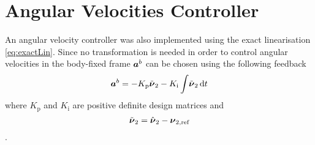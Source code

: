 \section{Angular Velocities Controller}  
An angular velocity controller was also implemented using the exact linearisation \eqref{eq:exactLin}.
Since no transformation is needed in order to control angular velocities in the body-fixed frame
$\accVector^b$ can be chosen using the following \abbrPI feedback 
\begin{equation}
	\accVector^b =-K_{\text{p}} \nuTildeAng - K_{\text{i}}\int \! \nuTildeAng \, \mathrm{d}t
\end{equation}
where $K_{\text{p}}$ and $K_{\text{i}}$ are positive definite design matrices and 
\begin{equation}
\nuTildeAng = \hat{\nuVector}_2 - \nuVectorAng[,{\text{ref}}]
\end{equation} \citep[p. 453]{fossen2011}.

